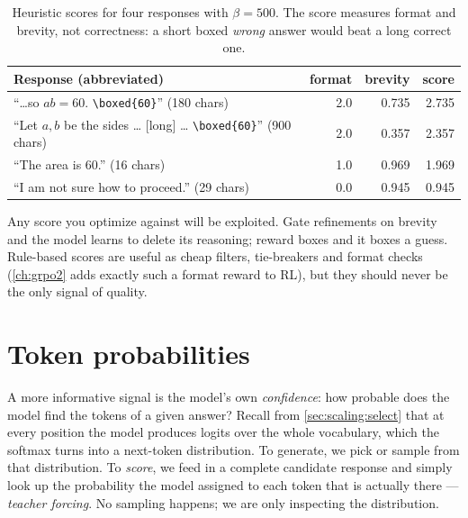 \begin{table}[t]
\centering\small
\begin{tabular}{@{}p{6.4cm}rrr@{}}
\toprule
Response (abbreviated) & format & brevity & score \\
\midrule
``\dots so $ab = 60$. \texttt{\textbackslash boxed\{60\}}'' (180 chars) & 2.0 & 0.735 & 2.735 \\
``Let $a,b$ be the sides \dots{} {[}long{]} \dots{} \texttt{\textbackslash boxed\{60\}}'' (900 chars) & 2.0 & 0.357 & 2.357 \\
``The area is 60.'' (16 chars) & 1.0 & 0.969 & 1.969 \\
``I am not sure how to proceed.'' (29 chars) & 0.0 & 0.945 & 0.945 \\
\bottomrule
\end{tabular}
\caption{Heuristic scores for four responses with $\beta = 500$. The score measures format and
brevity, not correctness: a short boxed \emph{wrong} answer would beat a long correct one.}
\label{tab:refine:heuristic}
\end{table}

\begin{pitfall}
Any score you optimize against will be exploited. Gate refinements on brevity and the model learns to
delete its reasoning; reward boxes and it boxes a guess. Rule-based scores are useful as cheap
filters, tie-breakers and format checks (\cref{ch:grpo2} adds exactly such a format reward to RL),
but they should never be the only signal of quality.
\end{pitfall}

\section{Token probabilities}\label{sec:refine:tokprob}


A more informative signal is the model's own \emph{confidence}: how probable does the model find
the tokens of a given answer? Recall from \cref{sec:scaling:select} that at every position the model
produces logits over the whole vocabulary, which the softmax turns into a next-token distribution.
To generate, we pick or sample from that distribution. To \emph{score}, we feed in a complete
candidate response and simply look up the probability the model assigned to each token that is
actually there --- \emph{teacher forcing}. No sampling happens; we are only inspecting the
distribution.

